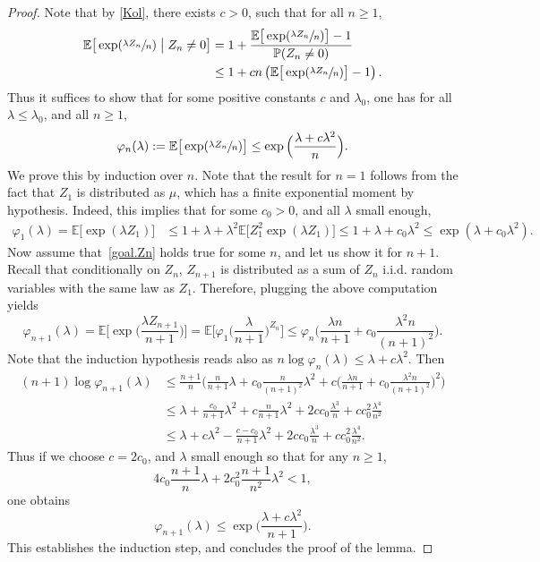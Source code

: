\documentclass[JEP,XML,SOM,Unicode,NoFloatCountersInSection,published]{cedram}
\theoremstyle{plain}
\theoremstyle{definition}
\newcommand{\1}{{\text{\Large $\mathfrak 1$}}}
\begin{document}
\begin{proof}
Note that by \eqref{Kol}, there exists $c>0$, such that for all $n\ge 1$,
\begin{align*}
\mathbb E\big[\exp(\sfrac{\lambda Z_n}{n})\bigm| Z_n\neq 0\big] & = 1+ \frac{\mathbb E\big[\exp(\sfrac{\lambda Z_n}{n})\big] - 1}{\mathbb P(Z_n\neq 0)}\\
& \le 1+ cn \left(\mathbb E\big[\exp(\sfrac{\lambda Z_n}{n})\big] - 1\right).
\end{align*}
Thus it suffices to show that for some positive constants $c$ and $\lambda_0$, one has for all $\lambda\le \lambda_0$, and all $n\ge 1$,
\begin{equation}\label{goal.Zn}
\varphi_n(\lambda):=\mathbb E\big[\exp(\sfrac{\lambda Z_n}{n})\big] \le \exp\Big(\frac{\lambda+c\lambda^2}{n}\Big).
\end{equation}
We prove this by induction over $n$. Note that the result for $n=1$ follows from the fact that $Z_1$ is distributed as $\mu$, which
has a finite exponential moment by hypothesis.
Indeed, this implies that for some $c_0>0$, and all $\lambda$ small enough,
\begin{align*}
\varphi_1(\lambda) = \mathbb E\big[\exp(\lambda Z_1)\big] & \le 1 + \lambda+ \lambda^2 \mathbb E\big[Z_1^2\exp(\lambda Z_1)\big] \le 1+ \lambda+
c_0 \lambda^2 \le \exp(\lambda+c_0 \lambda^2).
\end{align*}
Now assume that~\eqref{goal.Zn} holds true for some $n$, and let us show it for $n+1$.
Recall that conditionally on $Z_n$, $Z_{n+1}$ is distributed
as a sum of $Z_n$ i.i.d. random variables with the same law as $Z_1$.
Therefore, plugging the above computation yields
\[
\varphi_{n+1}(\lambda)= \mathbb E\Big[\exp\Big(\frac{\lambda Z_{n+1}}{n+1}\Big)\Big] = \mathbb E\Big[ \varphi_1\Big(\frac{\lambda}{n+1}\Big)^{Z_n}\Big]\le \varphi_n\Big(\frac{\lambda n}{n+1} + c_0\frac{\lambda^2 n}{(n+1)^2}\Big).
\]
Note that the induction hypothesis reads also as
$n\log \varphi_n(\lambda)\le \lambda+ c\lambda^2$. Then
\begin{equation*}%
\begin{split}
(n+1)\log \varphi_{n+1}(\lambda) & \le
\frac{n+1}{n}\Big(\frac{n}{n+1}\lambda+c_0\frac{n}{(n+1)^2}\lambda^2 +
c\Big(\frac{\lambda n}{n+1} + c_0\frac{\lambda^2 n}{(n+1)^2}\Big)^2\Big)\\
& \le \lambda +\frac{c_0}{n+1}\lambda^2+c\frac{n}{n+1}\lambda^2
+ 2cc_0\frac{\lambda^3}{n}+cc_0^2\frac{\lambda^4}{n^2}\\
& \le \lambda+ c\lambda^2-\frac{c-c_0}{n+1}\lambda^2+
2cc_0\frac{\lambda^3}{n}+cc_0^2\frac{\lambda^4}{n^2}.
\end{split}
\end{equation*}
Thus if we choose $c=2c_0$, and $\lambda$ small enough so that
for any $n\ge 1$,
\[
4c_0 \frac{n+1}{n} \lambda+ 2c_0^2\frac{n+1}{n^2} \lambda^2<1,
\]
one obtains
\begin{equation*}
\varphi_{n+1}(\lambda)\le \exp\Big(\frac{\lambda +c\lambda^2}{n+1}\Big).
\end{equation*}
This establishes the induction step, and concludes the proof of the lemma.
\end{proof}
\end{document}
